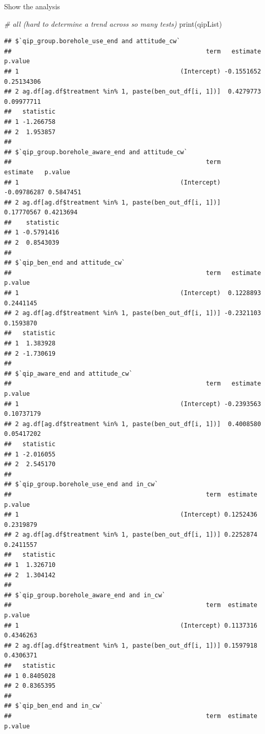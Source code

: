 \documentclass[
]{article}
\newenvironment{Shaded}{\begin{snugshade}}{\end{snugshade}}
\newcommand{\CommentTok}[1]{\textcolor[rgb]{0.56,0.35,0.01}{\textit{#1}}}
\newcommand{\FunctionTok}[1]{\textcolor[rgb]{0.00,0.00,0.00}{#1}}
\newcommand{\NormalTok}[1]{#1}
\begin{document}
Show the analysis

\begin{Shaded}
\begin{Highlighting}[]
\CommentTok{\# all (hard to determine a trend across so many tests)}
\FunctionTok{print}\NormalTok{(qipList)}
\end{Highlighting}
\end{Shaded}

\begin{verbatim}
## $`qip_group.borehole_use_end and attitude_cw`
##                                                     term   estimate    p.value
## 1                                            (Intercept) -0.1551652 0.25134306
## 2 ag.df[ag.df$treatment %in% 1, paste(ben_out_df[i, 1])]  0.4279773 0.09977711
##   statistic
## 1 -1.266758
## 2  1.953857
## 
## $`qip_group.borehole_aware_end and attitude_cw`
##                                                     term    estimate   p.value
## 1                                            (Intercept) -0.09786287 0.5847451
## 2 ag.df[ag.df$treatment %in% 1, paste(ben_out_df[i, 1])]  0.17770567 0.4213694
##    statistic
## 1 -0.5791416
## 2  0.8543039
## 
## $`qip_ben_end and attitude_cw`
##                                                     term   estimate   p.value
## 1                                            (Intercept)  0.1228893 0.2441145
## 2 ag.df[ag.df$treatment %in% 1, paste(ben_out_df[i, 1])] -0.2321103 0.1593870
##   statistic
## 1  1.383928
## 2 -1.730619
## 
## $`qip_aware_end and attitude_cw`
##                                                     term   estimate    p.value
## 1                                            (Intercept) -0.2393563 0.10737179
## 2 ag.df[ag.df$treatment %in% 1, paste(ben_out_df[i, 1])]  0.4008580 0.05417202
##   statistic
## 1 -2.016055
## 2  2.545170
## 
## $`qip_group.borehole_use_end and in_cw`
##                                                     term  estimate   p.value
## 1                                            (Intercept) 0.1252436 0.2319879
## 2 ag.df[ag.df$treatment %in% 1, paste(ben_out_df[i, 1])] 0.2252874 0.2411557
##   statistic
## 1  1.326710
## 2  1.304142
## 
## $`qip_group.borehole_aware_end and in_cw`
##                                                     term  estimate   p.value
## 1                                            (Intercept) 0.1137316 0.4346263
## 2 ag.df[ag.df$treatment %in% 1, paste(ben_out_df[i, 1])] 0.1597918 0.4306371
##   statistic
## 1 0.8405028
## 2 0.8365395
## 
## $`qip_ben_end and in_cw`
##                                                     term  estimate   p.value

\end{verbatim}
\end{document}
